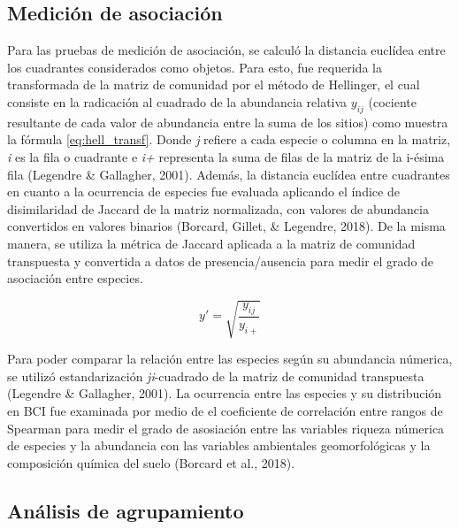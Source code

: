\documentclass[11pt,]{article}
\begin{document}
\subsection{Medición de asociación}\label{mediciuxf3n-de-asociaciuxf3n}

Para las pruebas de medición de asociación, se calculó la distancia
euclídea entre los cuadrantes considerados como objetos. Para esto, fue
requerida la transformada de la matriz de comunidad por el método de
Hellinger, el cual consiste en la radicación al cuadrado de la
abundancia relativa \(y_{ij}\) (cociente resultante de cada valor de
abundancia entre la suma de los sitios) como muestra la fórmula
\ref{eq:hell_transf}. Donde \emph{j} refiere a cada especie o columna en
la matriz, \emph{i} es la fila o cuadrante e \emph{i+} representa la
suma de filas de la matriz de la i-ésima fila (Legendre \& Gallagher,
2001). Además, la distancia euclídea entre cuadrantes en cuanto a la
ocurrencia de especies fue evaluada aplicando el índice de disimilaridad
de Jaccard de la matriz normalizada, con valores de abundancia
convertidos en valores binarios (Borcard, Gillet, \& Legendre, 2018). De
la misma manera, se utiliza la métrica de Jaccard aplicada a la matriz
de comunidad transpuesta y convertida a datos de presencia/ausencia para
medir el grado de asociación entre especies.

\begin{equation} \label{eq:hell_transf}
y' = \sqrt{\frac{y_{ij}}{y_{i+}}}
\end{equation}

Para poder comparar la relación entre las especies según su abundancia
númerica, se utilizó estandarización \emph{ji}-cuadrado de la matriz de
comunidad transpuesta (Legendre \& Gallagher, 2001). La ocurrencia entre
las especies y su distribución en BCI fue examinada por medio de el
coeficiente de correlación entre rangos de Spearman para medir el grado
de asosiación entre las variables riqueza númerica de especies y la
abundancia con las variables ambientales geomorfológicas y la
composición química del suelo (Borcard et al., 2018).

\subsection{Análisis de agrupamiento}\label{anuxe1lisis-de-agrupamiento}
\end{document}
